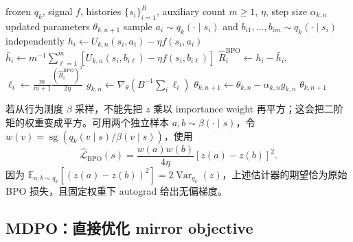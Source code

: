 \documentclass[lang=cn,scheme=chinese,openany]{../book/elegantbook}
\begin{document}
\begin{algorithm}[ht]
\caption{BPO inner update\\{\small\textit{Semantics: 固定 anchor 下对正向中心化残差求平方损失}}}
\begin{algorithmic}[1]
\Require frozen $ q_k$, signal $f$, histories $\{s_i\}_{i=1}^{B}$, auxiliary count $m\ge1$, $\eta$, step size $\alpha_{k,n}$
\Ensure updated parameters $\theta_{k,n+1}$
    \State sample $a_i\sim q_k(\cdot\mid s_i)$ and $b_{i1},\ldots,b_{im}\sim q_k(\cdot\mid s_i)$ independently
    \State $h_i\gets U_{k,n}(s_i,a_i)-\eta f(s_i,a_i)$
    \State $\bar h_i\gets m^{-1}\sum_{\ell=1}^{m}[U_{k,n}(s_i,b_{i\ell})-\eta f(s_i,b_{i\ell})]$
    \State $\widehat R_i^{\mathrm{BPO}}\gets h_i-\bar h_i$, $\ell_i\gets\frac{m}{m+1}\frac{(\widehat R_i^{\mathrm{BPO}})^2}{2\eta}$
\EndFor
\State $g_{k,n}\gets\nabla_\theta(B^{-1}\sum_i\ell_i)$
\State $\theta_{k,n+1}\gets\theta_{k,n}-\alpha_{k,n}g_{k,n}$
\State \Return $\theta_{k,n+1}$
\end{algorithmic}
\end{algorithm}

若从行为测度 $\beta$ 采样，不能先把 $z$ 乘以 importance weight 再平方；这会把二阶矩的权重变成平方。可用两个独立样本 $a,b\sim\beta(\cdot\mid s)$，令 $w(v)=\operatorname{sg}( q_k(v\mid s)/\beta(v\mid s))$，使用
\begin{equation*}
\widehat{\mathcal L}_{\mathrm{BPO}}(s)
=\frac{w(a)w(b)}{4\eta}[z(a)-z(b)]^2.
\end{equation*}
因为 $\mathbb E_{a,b\sim q_k}[(z(a)-z(b))^2]=2\operatorname{Var}_{ q_k}(z)$，上述估计器的期望恰为原始 BPO 损失，且固定权重下 autograd 给出无偏梯度。

\subsection{MDPO：直接优化 mirror objective}
\label{sec:ch2-mdpo-generic}
\end{document}
